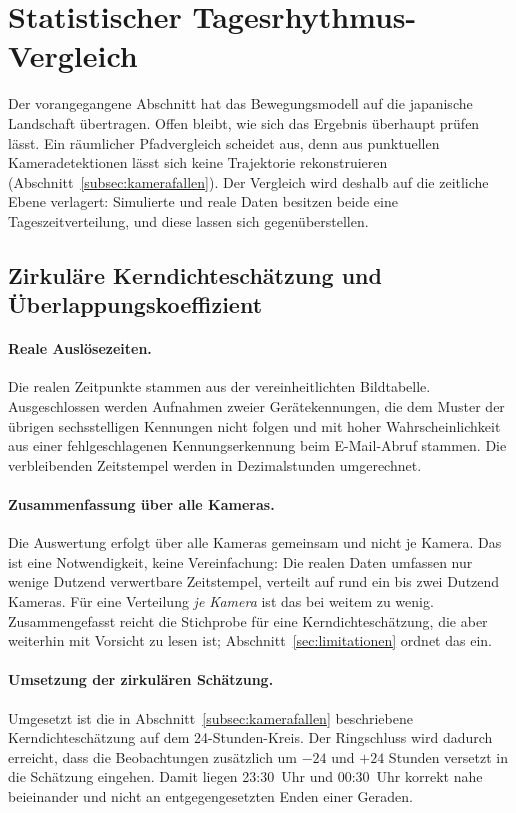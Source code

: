 \documentclass[12pt,a4paper]{report}
\begin{document}
\section{Statistischer Tagesrhythmus-Vergleich}
\label{sec:tagesrhythmus}

Der vorangegangene Abschnitt hat das Bewegungsmodell auf die japanische Landschaft
übertragen. Offen bleibt, wie sich das Ergebnis überhaupt prüfen lässt. Ein räumlicher
Pfadvergleich scheidet aus, denn aus punktuellen Kameradetektionen lässt sich keine
Trajektorie rekonstruieren (Abschnitt~\ref{subsec:kamerafallen}). Der Vergleich wird deshalb
auf die zeitliche Ebene verlagert: Simulierte und reale Daten besitzen beide eine
Tageszeitverteilung, und diese lassen sich gegenüberstellen.

\subsection{Zirkuläre Kerndichteschätzung und Überlappungskoeffizient}
\label{subsec:kde-umsetzung}

\paragraph{Reale Auslösezeiten.} Die realen Zeitpunkte stammen aus der vereinheitlichten
Bildtabelle. Ausgeschlossen werden Aufnahmen zweier Gerätekennungen, die dem Muster der
übrigen sechsstelligen Kennungen nicht folgen und mit hoher Wahrscheinlichkeit aus einer
fehlgeschlagenen Kennungserkennung beim E-Mail-Abruf stammen. Die verbleibenden Zeitstempel
werden in Dezimalstunden umgerechnet.

\paragraph{Zusammenfassung über alle Kameras.} Die Auswertung erfolgt über alle Kameras
gemeinsam und nicht je Kamera. Das ist eine Notwendigkeit, keine Vereinfachung: Die realen
Daten umfassen nur wenige Dutzend verwertbare Zeitstempel, verteilt auf rund ein bis zwei
Dutzend Kameras. Für eine Verteilung \emph{je Kamera} ist das bei weitem zu wenig.
Zusammengefasst reicht die Stichprobe für eine Kerndichteschätzung, die aber weiterhin mit
Vorsicht zu lesen ist; Abschnitt~\ref{sec:limitationen} ordnet das ein.

\paragraph{Umsetzung der zirkulären Schätzung.} Umgesetzt ist die in
Abschnitt~\ref{subsec:kamerafallen} beschriebene Kerndichteschätzung auf dem 24-Stunden-Kreis.
Der Ringschluss wird dadurch erreicht, dass die Beobachtungen zusätzlich um $-24$ und $+24$
Stunden versetzt in die Schätzung eingehen. Damit liegen 23:30~Uhr und 00:30~Uhr korrekt
nahe beieinander und nicht an entgegengesetzten Enden einer Geraden.
\end{document}

